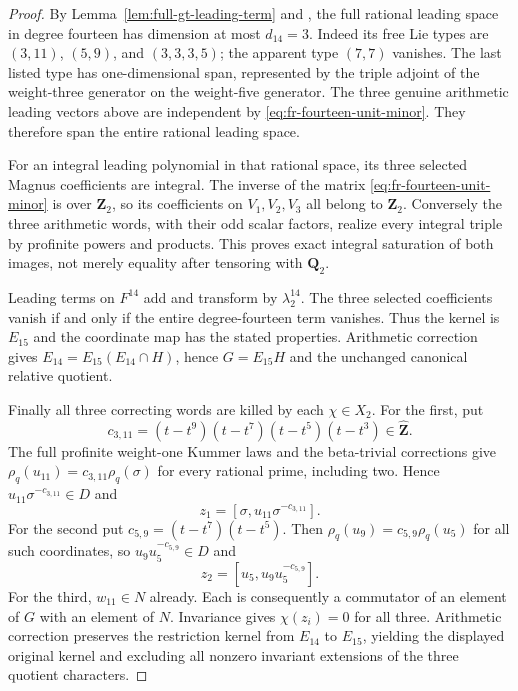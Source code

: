 \begin{proof}
By Lemma~\ref{lem:full-gt-leading-term} and
\cite[Theorem~1.1, p.~2]{Willwacher}, the full rational leading
space in degree fourteen has dimension at most $d_{14}=3$.
Indeed its free Lie types are $(3,11)$, $(5,9)$, and
$(3,3,3,5)$; the apparent type $(7,7)$ vanishes. The last
listed type has one-dimensional span, represented by the
triple adjoint of the weight-three generator on the
weight-five generator.
The three genuine arithmetic leading vectors above are
independent by \eqref{eq:fr-fourteen-unit-minor}. They
therefore span the entire rational leading space.

For an integral leading polynomial in that rational space,
its three selected Magnus coefficients are integral.
The inverse of the matrix
\eqref{eq:fr-fourteen-unit-minor} is over $\mathbf Z_2$,
so its coefficients on $V_1,V_2,V_3$ all belong to
$\mathbf Z_2$. Conversely the three arithmetic words, with
their odd scalar factors, realize every integral triple
by profinite powers and products. This proves exact
integral saturation of both images, not merely equality
after tensoring with $\mathbf Q_2$.

Leading terms on $F^{14}$ add and transform by
$\lambda_2^{14}$. The three selected coefficients vanish
if and only if the entire degree-fourteen term vanishes.
Thus the kernel is $E_{15}$ and the coordinate map has
the stated properties. Arithmetic correction gives
$E_{14}=E_{15}(E_{14}\cap H)$, hence $G=E_{15}H$ and
the unchanged canonical relative quotient.

Finally all three correcting words are killed by each
$\chi\in X_2$. For the first, put
\[
 c_{3,11}=(t-t^9)(t-t^7)(t-t^5)(t-t^3)
                    \in\widehat{\mathbf Z}.
\]
The full profinite weight-one Kummer laws and the
beta-trivial corrections give
$\rho_q(u_{11})=c_{3,11}\rho_q(\sigma)$ for every
rational prime, including two. Hence
$u_{11}\sigma^{-c_{3,11}}\in D$ and
\[
 z_1=[\sigma,u_{11}\sigma^{-c_{3,11}}].
\]
For the second put $c_{5,9}=(t-t^7)(t-t^5)$.
Then $\rho_q(u_9)=c_{5,9}\rho_q(u_5)$ for all such
coordinates, so $u_9u_5^{-c_{5,9}}\in D$ and
\[
 z_2=[u_5,u_9u_5^{-c_{5,9}}].
\]
For the third, $w_{11}\in N$ already. Each is consequently
a commutator of an element of $G$ with an element of $N$.
Invariance gives $\chi(z_i)=0$ for all three. Arithmetic
correction preserves the restriction kernel from
$E_{14}$ to $E_{15}$, yielding the displayed original
kernel and excluding all nonzero invariant extensions
of the three quotient characters.
\end{proof}
